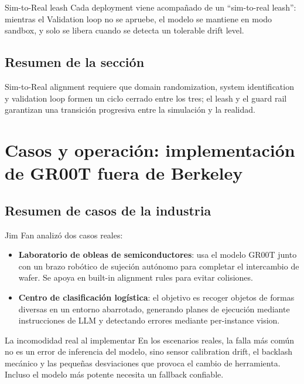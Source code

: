 \documentclass[a4paper]{article}
\begin{document}
\begin{importantbox}{Sim-to-Real leash}
Cada deployment viene acompañado de un ``sim-to-real leash'': mientras el Validation loop no se apruebe, el modelo se mantiene en modo sandbox, y solo se libera cuando se detecta un tolerable drift level.
\end{importantbox}

\subsection{Resumen de la sección}

Sim-to-Real alignment requiere que domain randomization, system identification y validation loop formen un ciclo cerrado entre los tres; el leash y el guard rail garantizan una transición progresiva entre la simulación y la realidad.

\section{Casos y operación: implementación de GR00T fuera de Berkeley}

\subsection{Resumen de casos de la industria}

Jim Fan analizó dos casos reales:

\begin{itemize}
    \item \textbf{Laboratorio de obleas de semiconductores}: usa el modelo GR00T junto con un brazo robótico de sujeción autónomo para completar el intercambio de wafer. Se apoya en built-in alignment rules para evitar colisiones.
    \item \textbf{Centro de clasificación logística}: el objetivo es recoger objetos de formas diversas en un entorno abarrotado, generando planes de ejecución mediante instrucciones de LLM y detectando errores mediante per-instance vision.
\end{itemize}

\begin{warningbox}{La incomodidad real al implementar}
En los escenarios reales, la falla más común no es un error de inferencia del modelo, sino sensor calibration drift, el backlash mecánico y las pequeñas desviaciones que provoca el cambio de herramienta. Incluso el modelo más potente necesita un fallback confiable.
\end{warningbox}
\end{document}
